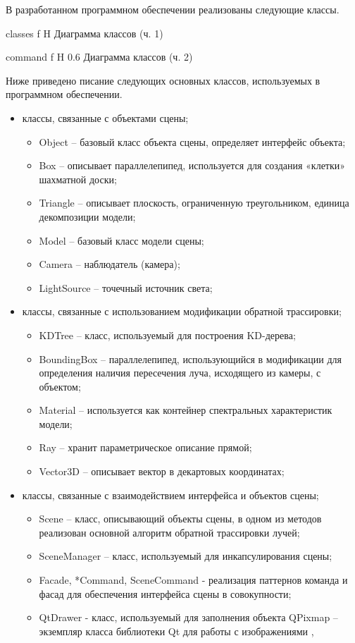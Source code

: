 В разработанном программном обеспечении реализованы следующие классы.

{classes}
{f}
{H}
{\textwidth}
{Диаграмма классов (ч. 1)}

{command}
{f}
{H}
{0.6\textwidth}
{Диаграмма классов (ч. 2)}

Ниже приведено писание следующих основных классов, используемых в программном обеспечении.

\begin{itemize}
	\item классы, связанные с объектами сцены;
	\begin{itemize}
		\item Object -- базовый класс объекта сцены, определяет интерфейс объекта;
		\item Box -- описывает параллелепипед, используется для создания «клетки» шахматной доски;
		\item Triangle -- описывает плоскость, ограниченную треугольником, единица декомпозиции модели;
		\item Model -- базовый класс модели сцены;
		\item Camera -- наблюдатель (камера);
		\item LightSource -- точечный источник света;
	\end{itemize}
	\item классы, связанные с использованием модификации обратной трассировки;
	\begin{itemize}
		\item KDTree -- класс, используемый для построения KD-дерева;
		\item BoundingBox -- параллелепипед, использующийся в модификации для определения наличия пересечения луча, исходящего из камеры, с объектом;
		\item Material -- используется как контейнер спектральных характеристик модели;
		\item Ray -- хранит параметрическое описание прямой;
		\item Vector3D -- описывает вектор в декартовых координатах;
	\end{itemize}
	\item классы, связанные с взаимодействием интерфейса и объектов сцены;
	\begin{itemize}
		\item Scene -- класс, описывающий объекты сцены, в одном из методов реализован основной алгоритм обратной трассировки лучей;
		\item SceneManager -- класс, используемый для инкапсулирования сцены;
		\item Facade, *Command, SceneCommand - реализация паттернов команда и фасад для обеспечения интерфейса сцены в совокупности;
		\item QtDrawer - класс, используемый для заполнения объекта QPixmap -- экземпляр класса библиотеки Qt для работы с изображениями \cite{qtdoc},
	\end{itemize}
\end{itemize}

